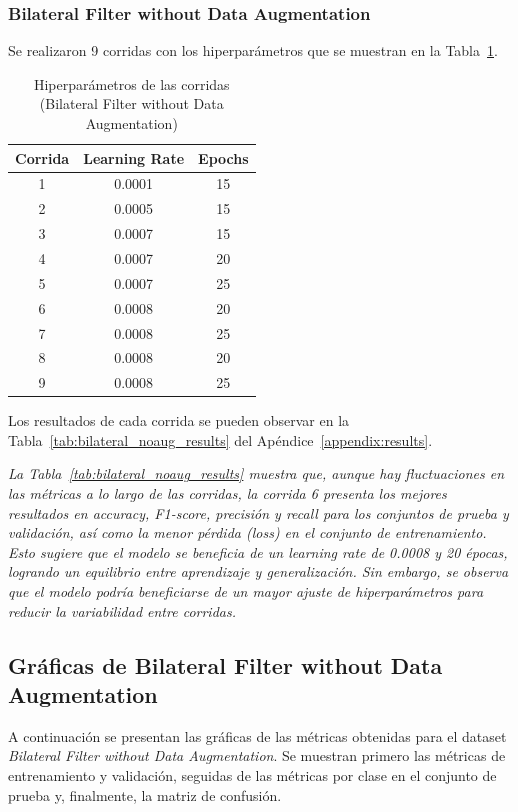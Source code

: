 \documentclass[conference]{IEEEtran}
\begin{document}
\subsubsection{Bilateral Filter without Data Augmentation}
Se realizaron 9 corridas con los hiperparámetros que se muestran en la Tabla~\ref{tab:bilateral_noaug_hparams}.

\begin{table}[H]
\caption{Hiperparámetros de las corridas (Bilateral Filter without Data Augmentation)}
\centering
\begin{tabular}{|c|c|c|}
\hline
\textbf{Corrida} & \textbf{Learning Rate} & \textbf{Epochs} \\
\hline
1 & 0.0001 & 15 \\
2 & 0.0005 & 15 \\
3 & 0.0007 & 15 \\
4 & 0.0007 & 20 \\
5 & 0.0007 & 25 \\
6 & 0.0008 & 20 \\
7 & 0.0008 & 25 \\
8 & 0.0008 & 20 \\
9 & 0.0008 & 25 \\
\hline
\end{tabular}
\label{tab:bilateral_noaug_hparams}
\end{table}

Los resultados de cada corrida se pueden observar en la Tabla~\ref{tab:bilateral_noaug_results} del Apéndice~\ref{appendix:results}.

\noindent\textit{
La Tabla~\ref{tab:bilateral_noaug_results} muestra que, aunque hay fluctuaciones en las métricas a lo largo de las corridas, la corrida 6 presenta los mejores resultados en accuracy, F1-score, precisión y recall para los conjuntos de prueba y validación, así como la menor pérdida (loss) en el conjunto de entrenamiento. Esto sugiere que el modelo se beneficia de un learning rate de 0.0008 y 20 épocas, logrando un equilibrio entre aprendizaje y generalización. Sin embargo, se observa que el modelo podría beneficiarse de un mayor ajuste de hiperparámetros para reducir la variabilidad entre corridas.
}

\subsection{Gráficas de Bilateral Filter without Data Augmentation}

A continuación se presentan las gráficas de las métricas obtenidas para el dataset \textit{Bilateral Filter without Data Augmentation}. Se muestran primero las métricas de entrenamiento y validación, seguidas de las métricas por clase en el conjunto de prueba y, finalmente, la matriz de confusión.
\end{document}
